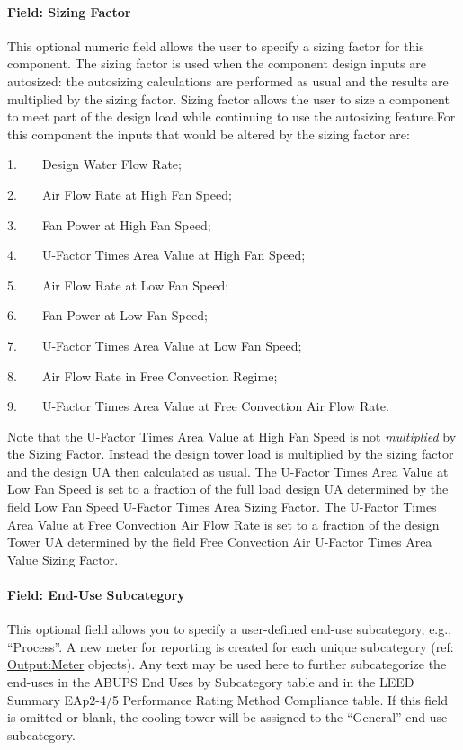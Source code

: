 \paragraph{Field: Sizing Factor}\label{field-sizing-factor}

This optional numeric field allows the user to specify a sizing factor for this component. The sizing factor is used when the component design inputs are autosized: the autosizing calculations are performed as usual and the results are multiplied by the sizing factor. Sizing factor allows the user to size a component to meet part of the design load while continuing to use the autosizing feature.For this component the inputs that would be altered by the sizing factor are:

1.~~~~Design Water Flow Rate;

2.~~~~Air Flow Rate at High Fan Speed;

3.~~~~Fan Power at High Fan Speed;

4.~~~~U-Factor Times Area Value at High Fan Speed;

5.~~~~Air Flow Rate at Low Fan Speed;

6.~~~~Fan Power at Low Fan Speed;

7.~~~~U-Factor Times Area Value at Low Fan Speed;

8.~~~~Air Flow Rate in Free Convection Regime;

9.~~~~U-Factor Times Area Value at Free Convection Air Flow Rate.

Note that the U-Factor Times Area Value at High Fan Speed is not \emph{multiplied} by the Sizing Factor. Instead the design tower load is multiplied by the sizing factor and the design UA then calculated as usual. The U-Factor Times Area Value at Low Fan Speed is set to a fraction of the full load design UA determined by the field Low Fan Speed U-Factor Times Area Sizing Factor. The U-Factor Times Area Value at Free Convection Air Flow Rate is set to a fraction of the design Tower UA determined by the field Free Convection Air U-Factor Times Area Value Sizing Factor.

\paragraph{Field: End-Use Subcategory}\label{end-use-subcategory-02}

This optional field allows you to specify a user-defined end-use subcategory, e.g., ``Process''. A new meter for reporting is created for each unique subcategory (ref: \hyperref[outputmeter-and-outputmetermeterfileonly]{Output:Meter} objects). Any text may be used here to further subcategorize the end-uses in the ABUPS End Uses by Subcategory table and in the LEED Summary EAp2-4/5 Performance Rating Method Compliance table. If this field is omitted or blank, the cooling tower will be assigned to the ``General'' end-use subcategory.

